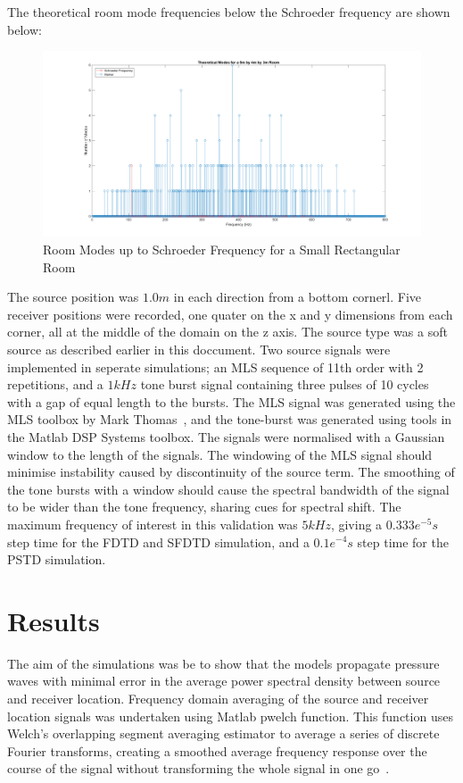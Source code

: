 The theoretical room mode frequencies below the Schroeder frequency are shown below:\\
\begin{figure}[H]
\centering
  \includegraphics[width=\textwidth]{./graphics/modesuptoschr.png}
  \caption{Room Modes up to Schroeder Frequency for a Small Rectangular Room}
\end{figure}

The source position was $1.0m$ in each direction from a bottom cornerl. Five receiver positions were recorded, one quater on the x and y dimensions from each corner, all at the middle of the domain on the z axis. The source type was a soft source as described earlier in this doccument. Two source signals were implemented in seperate simulations; an MLS sequence of 11th order with 2 repetitions, and a $1kHz$ tone burst signal containing three pulses of 10 cycles with a gap of equal length to the bursts. The MLS signal was generated using the MLS toolbox by Mark Thomas~\cite{Mrt2008}, and the tone-burst was generated using tools in the Matlab DSP Systems toolbox. The signals were normalised with a Gaussian window to the length of the signals. The windowing of the MLS signal should minimise instability caused by discontinuity of the source term. The smoothing of the tone bursts with a window should cause the spectral bandwidth of the signal to be wider than the tone frequency, sharing cues for spectral shift. The maximum frequency of interest in this validation was $5kHz$, giving a $0.333e^{-5}s$ step time for the FDTD and SFDTD simulation, and a $0.1e^{-4}s$ step time for the PSTD simulation.

\section{Results}
The aim of the simulations was be to show that the models propagate pressure waves with minimal error in the average power spectral density between source and receiver location. Frequency domain averaging of the source and receiver location signals was undertaken using Matlab pwelch function. This function uses Welch's overlapping segment averaging estimator to average a series of discrete Fourier transforms, creating a smoothed average frequency response over the course of the signal without transforming the whole signal in one go~\cite{Welch1967}.

